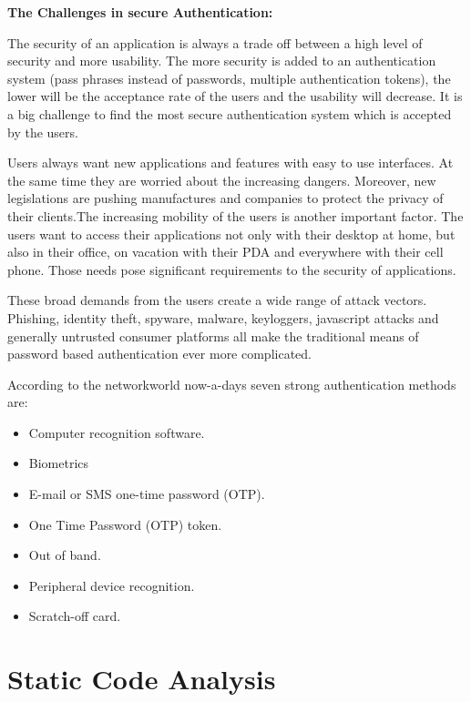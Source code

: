 \textbf{The Challenges in secure Authentication:}

The security of an application is always a trade off between a high level of security and more usability. The more security is added to an authentication system (pass phrases instead of passwords, multiple authentication tokens), the lower will be the acceptance rate of the users and the usability will decrease. It is a big challenge to find the most secure authentication system which is accepted by the users. 

Users always want new applications and features with easy to use interfaces. At the same time they are worried about the increasing dangers. Moreover, new legislations are pushing manufactures and companies to protect the privacy of their clients.The increasing mobility of the users is another important factor. The users want to access their applications not only with their desktop at home, but also in their office, on vacation with their PDA and everywhere with their cell phone. Those needs pose significant requirements to the security of applications. 

These broad demands from the users create a wide range of attack vectors. Phishing, identity theft, spyware, malware, keyloggers, javascript attacks and generally untrusted consumer platforms all make the traditional means of password based authentication ever more complicated.


According to the networkworld \cite{ref_21_networld} now-a-days seven strong authentication methods are:
\begin{itemize}
\item Computer recognition software.
\item Biometrics
\item E-mail or SMS one-time password (OTP).
\item One Time Password (OTP) token.
\item Out of band.
\item Peripheral device recognition.
\item Scratch-off card.
\end{itemize}	

\section{Static Code Analysis}

